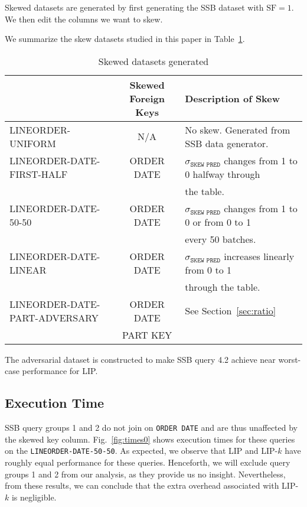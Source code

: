 Skewed datasets are generated by first generating the SSB dataset with $\text{SF} = 1$.
We then edit the columns we want to skew. 



We summarize the skew datasets studied in this paper in Table~\ref{tab:skew_datasets}.

\begin{table}
\begin{center}
\begin{tabular}{ |>{\ttfamily}l|>{\ttfamily}c|l| } 
\hline
{\bf Dataset Name} & {\bf Skewed Foreign Keys} & {\bf Description of Skew} \\
\hline
\hline
LINEORDER-UNIFORM& N/A & No skew. Generated from SSB data generator.\\
\hline
LINEORDER-DATE-FIRST-HALF& ORDER DATE & $\sigma_{\texttt{SKEW PRED}}$ changes from 1 to 0 halfway through\\
& &  the table.\\
\hline
LINEORDER-DATE-50-50& ORDER DATE & $\sigma_{\texttt{SKEW PRED}}$ changes from 1 to 0 or from 0 to 1 \\
& & every 50 batches. \\ 
\hline
LINEORDER-DATE-LINEAR& ORDER DATE & $\sigma_{\texttt{SKEW PRED}}$ increases linearly from 0 to 1 \\
& & through the table. \\
\hline
LINEORDER-DATE-PART-ADVERSARY& ORDER DATE & See Section~\ref{sec:ratio}\\
& PART KEY & \\
\hline
\end{tabular}
\end{center}

\caption{Skewed datasets generated}
\label{tab:skew_datasets}
\end{table}

The adversarial dataset is constructed to make SSB query 4.2 achieve near worst-case performance for LIP. 


\subsection{Execution Time}
\label{sec:time}



SSB query groups 1 and 2 do not join on \texttt{ORDER DATE} and are thus unaffected by the skewed key column. 
Fig.~\ref{fig:times0} shows execution times for these queries on the \texttt{LINEORDER-DATE-50-50}.
As expected, we observe that LIP and LIP-$k$ have roughly equal performance for these queries.
Henceforth, we will exclude query groups 1 and 2 from our analysis, 
as they provide us no insight. 
Nevertheless, from these results, we can conclude that the extra overhead associated with LIP-$k$ is negligible.



